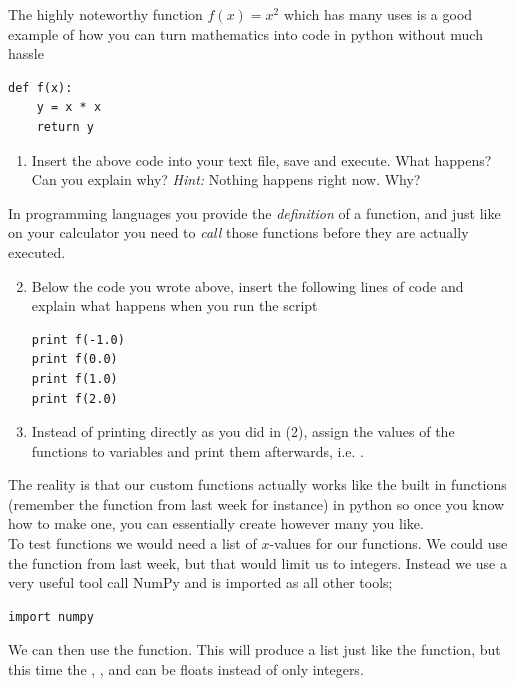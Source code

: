 \documentclass{article}
\begin{document}
The highly noteworthy function $f(x)=x^2$ which has many uses is a good example
of how you can turn mathematics into code in python without much hassle

\begin{lstlisting}
def f(x):
    y = x * x
    return y
\end{lstlisting}


\begin{enumerate}
  \item Insert the above code into your text file, save and execute. What
      happens? Can you explain why? {\em Hint:} Nothing happens right now. Why?
\end{enumerate}

In programming languages you provide the {\em definition} of a function, and
just like on your calculator you need to {\em call} those functions before they
are actually executed.

\begin{enumerate}
  \setcounter{enumi}{1}
  \item Below the code you wrote above, insert the following lines of code and
    explain what happens when you run the script

\begin{lstlisting}
print f(-1.0)
print f(0.0)
print f(1.0)
print f(2.0)
\end{lstlisting}

  \item Instead of printing directly as you did in (2), assign the values of
    the functions to variables and print them afterwards, i.e. .

\end{enumerate}

The reality is that our custom functions actually works like the built in
functions (remember the  function from last week for instance)
in python so once you know how to make one, you can essentially create however
many you like.\\

To test functions we would need a list of $x$-values for our functions.
We could use the  function from last week, but that would limit us to
integers. Instead we use a very useful tool call NumPy and is imported as all other tools;

\begin{lstlisting}
import numpy
\end{lstlisting}

We can then use the  function.
This will produce a list just like the  function, but this time the
,
, and
can be floats instead of only integers.
\end{document}
